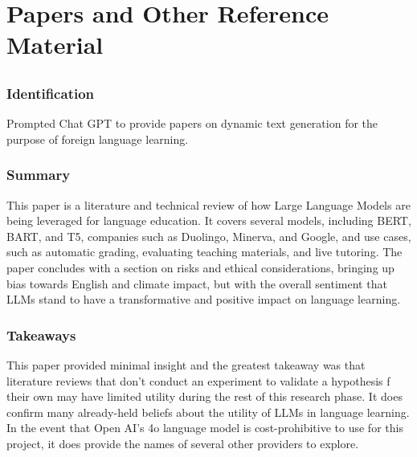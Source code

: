 \documentclass[
	letterpaper, %
]{jdf}
\begin{document}
\section{Papers and Other Reference Material}

\subsection{}
\subsubsection{Identification}
Prompted Chat GPT to provide papers on dynamic text generation for the purpose of foreign language learning.

\subsubsection{Summary}
This paper is a literature and technical review of how Large Language Models are being leveraged for language education. It covers several models, including BERT, BART, and T5, companies such as Duolingo, Minerva, and Google, and use cases, such as automatic grading, evaluating teaching materials, and live tutoring. The paper concludes with a section on risks and ethical considerations, bringing up bias towards English and climate impact, but with the overall sentiment that LLMs stand to have a transformative and positive impact on language learning. 

\subsubsection{Takeaways}
This paper provided minimal insight and the greatest takeaway was that literature reviews that don't conduct an experiment to validate a hypothesis f their own may have limited utility during the rest of this research phase. It does confirm many already-held beliefs about the utility of LLMs in language learning. In the event that Open AI's 4o language model is cost-prohibitive to use for this project, it does provide the names of several other providers to explore.
\end{document}

